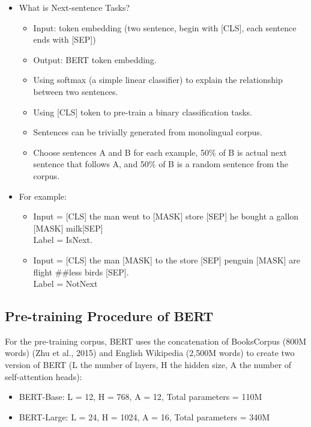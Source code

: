 \documentclass[]{krantz}
\providecommand{\tightlist}{%
  \setlength{\itemsep}{0pt}\setlength{\parskip}{0pt}}
\begin{document}
\begin{itemize}
\tightlist
\item
  What is Next-sentence Tasks?

  \begin{itemize}
  \tightlist
  \item
    Input: token embedding (two sentence, begin with {[}CLS{]}, each sentence ends with {[}SEP{]})
  \item
    Output: BERT token embedding.
  \item
    Using softmax (a simple linear classifier) to explain the relationship between two sentences.
  \item
    Using {[}CLS{]} token to pre-train a binary classification tasks.
  \item
    Sentences can be trivially generated from monolingual corpus.
  \item
    Choose sentences A and B for each example, 50\% of B is actual next sentence that follows A, and 50\% of B is a random sentence from the corpus.
  \end{itemize}
\item
  For example:

  \begin{itemize}
  \tightlist
  \item
    Input = {[}CLS{]} the man went to {[}MASK{]} store {[}SEP{]} he bought a gallon {[}MASK{]} milk{[}SEP{]}\\
    Label = IsNext.
  \item
    Input = {[}CLS{]} the man {[}MASK{]} to the store {[}SEP{]} penguin {[}MASK{]} are flight \#\#less birds {[}SEP{]}.\\
    Label = NotNext
  \end{itemize}
\end{itemize}

\hypertarget{pre-training-procedure-of-bert}{%
\subsection{Pre-training Procedure of BERT}\label{pre-training-procedure-of-bert}}

For the pre-training corpus, BERT uses the concatenation of BooksCorpus (800M words) (Zhu et al., 2015) and English Wikipedia (2,500M words) to create two version of BERT (L the number of layers, H the hidden size, A the number of self-attention heads):

\begin{itemize}
\tightlist
\item
  BERT-Base: L = 12, H = 768, A = 12, Total parameters = 110M
\item
  BERT-Large: L = 24, H = 1024, A = 16, Total parameters = 340M
\end{itemize}
\end{document}
